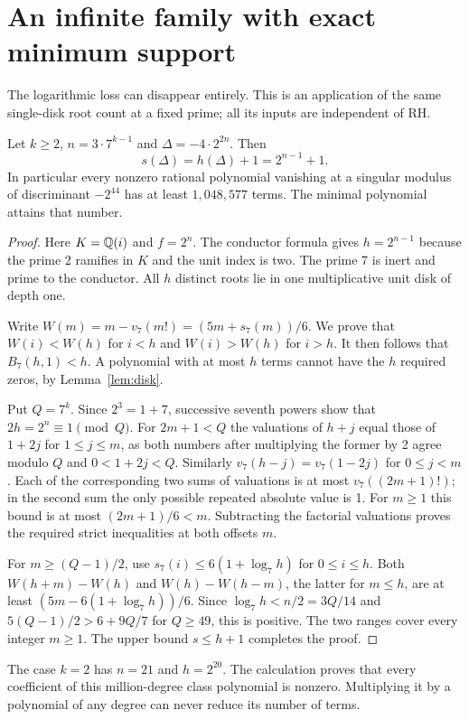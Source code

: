 \section{An infinite family with exact minimum support}
The logarithmic loss can disappear entirely. This is an application of the same single-disk root count at a fixed prime; all its inputs are independent of RH.

\begin{theorem}\label{th:extreme}
Let $k\ge2$, $n=3\cdot7^{k-1}$ and $\Delta=-4\cdot 2^{2n}$. Then
\[
             s(\Delta)=h(\Delta)+1=2^{n-1}+1 .
\]
In particular every nonzero rational polynomial vanishing at a singular modulus of discriminant $-2^{44}$ has at least $1{,}048{,}577$ terms. The minimal polynomial attains that number.
\end{theorem}
\begin{proof}
Here $K=\mathbb Q(i)$ and $f=2^n$. The conductor formula gives $h=2^{n-1}$ because the prime 2 ramifies in $K$ and the unit index is two. The prime 7 is inert and prime to the conductor. All $h$ distinct roots lie in one multiplicative unit disk of depth one.

Write $W(m)=m-v_7(m!)=(5m+s_7(m))/6$. We prove that $W(i)<W(h)$ for $i<h$ and $W(i)>W(h)$ for $i>h$. It then follows that $B_7(h,1)<h$. A polynomial with at most $h$ terms cannot have the $h$ required zeros, by Lemma~\ref{lem:disk}.

Put $Q=7^k$. Since $2^3=1+7$, successive seventh powers show that $2h=2^n\equiv1\pmod Q$. For $2m+1<Q$ the valuations of $h+j$ equal those of $1+2j$ for $1\le j\le m$, as both numbers after multiplying the former by 2 agree modulo $Q$ and $0<1+2j<Q$. Similarly $v_7(h-j)=v_7(1-2j)$ for $0\le j<m$. Each of the corresponding two sums of valuations is at most $v_7((2m+1)!)$; in the second sum the only possible repeated absolute value is 1. For $m\ge1$ this bound is at most $(2m+1)/6<m$. Subtracting the factorial valuations proves the required strict inequalities at both offsets $m$.

For $m\ge(Q-1)/2$, use $s_7(i)\le6(1+\log_7 h)$ for $0\le i\le h$. Both $W(h+m)-W(h)$ and $W(h)-W(h-m)$, the latter for $m\le h$, are at least $(5m-6(1+\log_7 h))/6$. Since $\log_7 h<n/2=3Q/14$ and $5(Q-1)/2>6+9Q/7$ for $Q\ge49$, this is positive. The two ranges cover every integer $m\ge1$. The upper bound $s\le h+1$ completes the proof.
\end{proof}
The case $k=2$ has $n=21$ and $h=2^{20}$. The calculation proves that every coefficient of this million-degree class polynomial is nonzero. Multiplying it by a polynomial of any degree can never reduce its number of terms.

